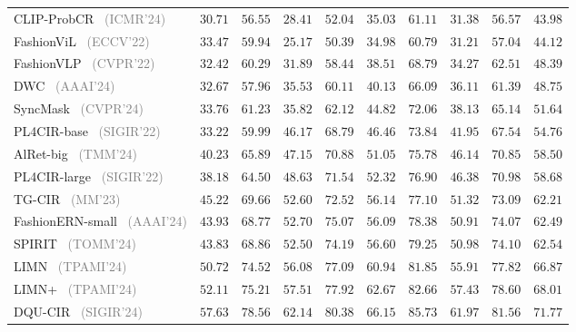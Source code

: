 \begin{table*}
\begin{tabular}{l|cc|cc|cc|cc|c}
    CLIP-ProbCR~\cite{li2024clip} \footnotesize{\textcolor{gray}{(ICMR'24)}} & $30.71$ & $56.55$ & $28.41$ & $52.04$ & $35.03$ & $61.11$ & $31.38$ & $56.57$ & $43.98$ \\
    FashionViL~\cite{han2022fashionvil} \footnotesize{\textcolor{gray}{(ECCV'22)}} & $33.47$ & $59.94$ & $25.17$ & $50.39$ & $34.98$ & $60.79$ & $31.21$ & $57.04$ & $44.12$ \\
    FashionVLP~\cite{goenka2022fashionvlp} \footnotesize{\textcolor{gray}{(CVPR'22)}} & $32.42$ & $60.29$ & $31.89$ & $58.44$ & $38.51$ & $68.79$ & $34.27$ & $62.51$ & $48.39$ \\
    DWC~\cite{huang2024dwc} \footnotesize{\textcolor{gray}{(AAAI'24)}} & $32.67$ & $57.96$ & $35.53$ & $60.11$ & $40.13$ & $66.09$ & $36.11$ & $61.39$ & $48.75$ \\
    SyncMask~\cite{song2024syncmask} \footnotesize{\textcolor{gray}{(CVPR'24)}} & $33.76$ & $61.23$ & $35.82$ & $62.12$ & $44.82$ & $72.06$ & $38.13$ & $65.14$ & $51.64$ \\
    PL4CIR-base~\cite{zhao2022PL4CIR} \footnotesize{\textcolor{gray}{(SIGIR'22)}} & $33.22$ & $59.99$ & $46.17$ & $68.79$ & $46.46$ & $73.84$ & $41.95$ & $67.54$ & $54.76$ \\
    AlRet-big~\cite{xu2024alret} \footnotesize{\textcolor{gray}{(TMM'24)}} & $40.23$ & $65.89$ & $47.15$ & $70.88$ & $51.05$ & $75.78$ & $46.14$ & $70.85$ & $58.50$ \\
    PL4CIR-large~\cite{zhao2022PL4CIR} \footnotesize{\textcolor{gray}{(SIGIR'22)}} & $38.18$ & $64.50$ & $48.63$ & $71.54$ & $52.32$ & $76.90$ & $46.38$ & $70.98$ & $58.68$ \\
    TG-CIR~\cite{wen2023tgcir} \footnotesize{\textcolor{gray}{(MM'23)}} & $45.22$ & $69.66$ & $52.60$ & $72.52$ & $56.14$ & $77.10$ & $51.32$ & $73.09$ & $62.21$ \\
    FashionERN-small~\cite{chen2024fashionern} \footnotesize{\textcolor{gray}{(AAAI'24)}} & $43.93$ & $68.77$ & $52.70$ & $75.07$ & $56.09$ & $78.38$ & $50.91$ & $74.07$ & $62.49$ \\
    SPIRIT~\cite{chen2024spirit} \footnotesize{\textcolor{gray}{(TOMM'24)}} & $43.83$ & $68.86$ & $52.50$ & $74.19$ & $56.60$ & $79.25$ & $50.98$ & $74.10$ & $62.54$ \\
    LIMN~\cite{wen2023limn} \footnotesize{\textcolor{gray}{(TPAMI'24)}} & $50.72$ & $74.52$ & $56.08$ & $77.09$ & $60.94$ & $81.85$ & $55.91$ & $77.82$ & $66.87$ \\
    LIMN+~\cite{wen2023limn} \footnotesize{\textcolor{gray}{(TPAMI'24)}} & $52.11$ & $75.21$ & $57.51$ & $77.92$ & $62.67$ & $82.66$ & $57.43$ & $78.60$ & $68.01$ \\
    DQU-CIR~\cite{wen2024dqu} \footnotesize{\textcolor{gray}{(SIGIR'24)}} & $57.63$ & $78.56$ & $62.14$ & $80.38$ & $66.15$ & $85.73$ & $61.97$ & $81.56$ & $71.77$ \\
    
    \hline
    \end{tabular}
    \label{tab:supervised_CIR_exp_fashioniq_val}
\end{table*}

